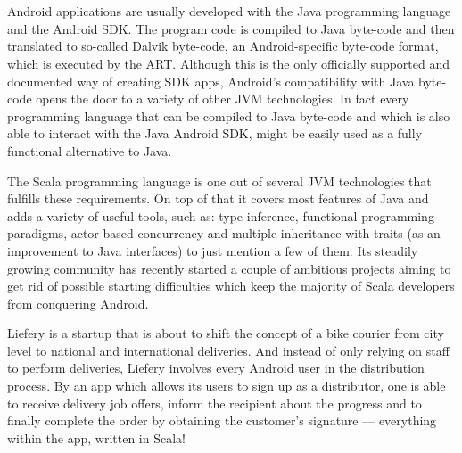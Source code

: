 \section*{}

Android applications are usually developed with the Java programming language and the Android \ac{SDK}. The program code is compiled to Java byte-code and then translated to so-called Dalvik byte-code, an Android-specific byte-code format, which is executed by the \ac{ART}. Although this is the only officially supported and documented way of creating SDK apps, Android's compatibility with Java byte-code opens the door to a variety of other \ac{JVM} technologies. In fact every programming language that can be compiled to Java byte-code and which is also able to interact with the Java Android SDK, might be easily used as a fully functional alternative to Java.

The Scala programming language is one out of several JVM technologies that fulfills these requirements. On top of that it covers most features of Java and adds a variety of useful tools, such as: type inference, functional programming paradigms, actor-based concurrency and multiple inheritance with traits (as an improvement to Java interfaces) to just mention a few of them. Its steadily growing community has recently started a couple of ambitious projects aiming to get rid of possible starting difficulties which keep the majority of Scala developers from conquering Android.

Liefery is a startup that is about to shift the concept of a bike courier from city level to national and international deliveries. And instead of only relying on staff to perform deliveries, Liefery involves every Android user in the distribution process. By an app which allows its users to sign up as a distributor, one is able to receive delivery job offers, inform the recipient about the progress and to finally complete the order by obtaining the customer's signature — everything within the app, written in Scala!